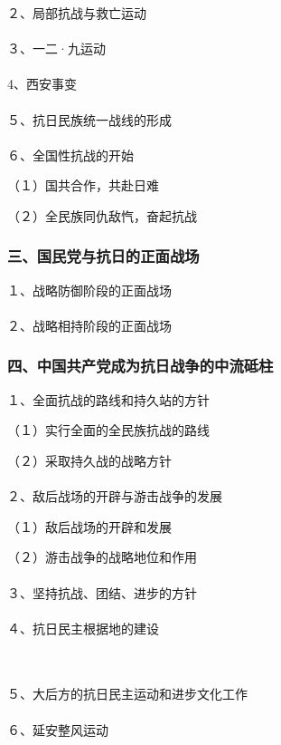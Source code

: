\documentclass{ctexart}
\begin{document}
２、局部抗战与救亡运动
\\\\

３、一二·九运动
\\\\

4、西安事变
\\\\

５、抗日民族统一战线的形成
\\\\

６、全国性抗战的开始

（１）国共合作，共赴日难

（２）全民族同仇敌忾，奋起抗战

\subsubsection{三、国民党与抗日的正面战场}
１、战略防御阶段的正面战场
\\\\

２、战略相持阶段的正面战场

\subsubsection{四、中国共产党成为抗日战争的中流砥柱}

１、全面抗战的路线和持久站的方针

（１）实行全面的全民族抗战的路线

（２）采取持久战的战略方针
\\\\

２、敌后战场的开辟与游击战争的发展

（１）敌后战场的开辟和发展

（２）游击战争的战略地位和作用
\\\\

３、坚持抗战、团结、进步的方针
\\\\

４、抗日民主根据地的建设

\\\\
５、大后方的抗日民主运动和进步文化工作
\\\\

６、延安整风运动
\\\\
\end{document}
